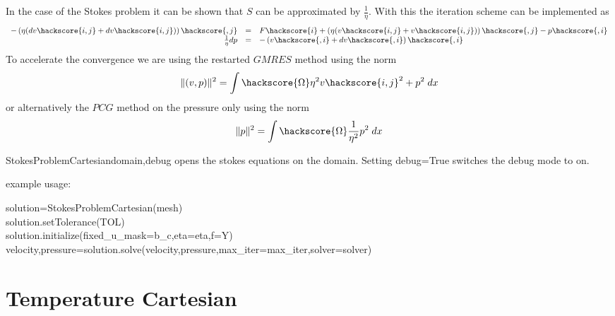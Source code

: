 In the case of the Stokes problem it can be shown that $S$ can be approximated by $\frac{1}{\eta}$. With this the iteration scheme can be implemented as
\begin{equation}
\begin{array}{rcl}
-\left(\eta(dv\hackscore{i,j}+ dv\hackscore{i,j})\right)\hackscore{,j} & = & F\hackscore{i}+\left(\eta(v\hackscore{i,j}+ v\hackscore{i,j})\right)\hackscore{,j}-p\hackscore{,i} \\
\frac{1}{\eta} dp & = & - \left(v\hackscore{,i}+dv\hackscore{,i} \right)\hackscore{,i} \\
\end{array}
\label{SADDLEPOINT iteration 2}
\end{equation}
To accelerate the convergence we are using the restarted $GMRES$ method using the norm
\begin{equation}
\|(v,p)\|^2= \int\hackscore{\Omega} \eta^2 v\hackscore{i,j}^2 + p^2 \; dx
\label{SADDLEPOINT iteration 3}
\end{equation}
or alternatively the $PCG$ method on the pressure only using the norm 
\begin{equation}
\|p\|^2= \int\hackscore{\Omega} \frac{1}{\eta^2} p^2 \; dx
\label{SADDLEPOINT iteration 4}
\end{equation}





\begin{classdesc}{StokesProblemCartesian}{domain,debug}
opens the stokes equations on the \Domain domain. Setting debug=True switches the debug mode to on.
\end{classdesc}

example usage:

solution=StokesProblemCartesian(mesh) \\
solution.setTolerance(TOL) \\
solution.initialize(fixed\_u\_mask=b\_c,eta=eta,f=Y) \\
velocity,pressure=solution.solve(velocity,pressure,max\_iter=max\_iter,solver=solver) \\

% 


\section{Temperature Cartesian}

